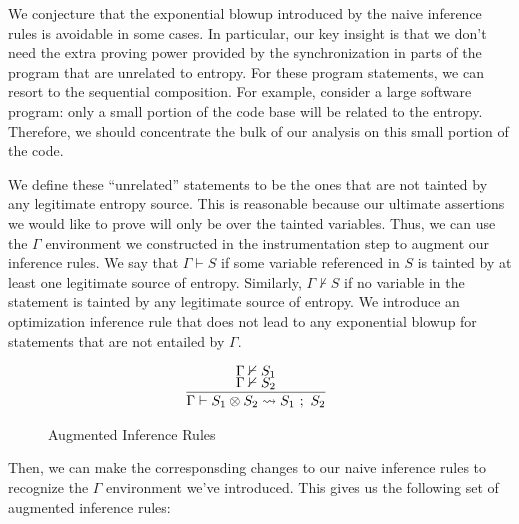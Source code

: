 \documentclass[letterpaper,twocolumn,10pt]{article}
\newcommand{\cross}{\otimes{}}
\begin{document}
We conjecture that the exponential blowup introduced by the naive inference rules is avoidable in some cases. In particular, our key insight is that we don't need the extra proving power provided by the synchronization in parts of the program that are unrelated to entropy. For these program statements, we can resort to the sequential composition. For example, consider a large software program: only a small portion of the code base will be related to the entropy. Therefore, we should concentrate the bulk of our analysis on this small portion of the code. 

We define these ``unrelated'' statements to be the ones that are not tainted by any legitimate entropy source. This is reasonable because our ultimate assertions we would like to prove will only be over the tainted variables. Thus, we can use the $\Gamma$ environment we constructed in the instrumentation step to augment our inference rules. We say that $\Gamma \vdash S$ if some variable referenced in $S$ is tainted by at least one legitimate source of entropy. Similarly, $\Gamma \nvdash S$ if no variable in the statement is tainted by any legitimate source of entropy. We introduce an optimization inference rule that does not lead to any exponential blowup for statements that are not entailed by $\Gamma$. 

\begin{figure}
    \label{fig:auginfrules1}
    \caption{Augmented Inference Rules}
    \[
		\begin{array}{c}
			\infer[]{\Gamma \vdash S_1 \cross S_2 \leadsto S_1\ ;\ S_2}{
				\Gamma \nvdash S_1 \\
				\Gamma \nvdash S_2
			} \\
		\end{array}
    \]
\end{figure}

Then, we can make the corresponsding changes to our naive inference rules to recognize the $\Gamma$ environment we've introduced. This gives us the following set of augmented inference rules: %
\end{document}
